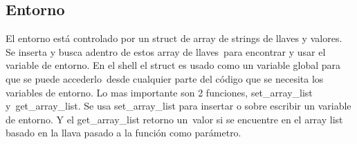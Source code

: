 \newpage
\subsection{Entorno}
El entorno está controlado por un struct de array de strings de llaves y valores. Se inserta y busca adentro de estos array de llaves\
para encontrar y usar el variable de entorno. En el shell el struct es usado como un variable global para que se puede accederlo\
desde cualquier parte del código que se necesita los variables de entorno. Lo mas importante son 2 funciones, set\_array\_list y\
get\_array\_list. Se usa set\_array\_list para insertar o sobre escribir un variable de entorno. Y el get\_array\_list retorno un\
valor si se encuentre en el array list basado en la llava pasado a la función como parámetro.
